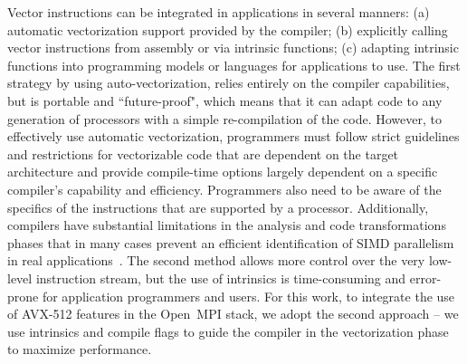 \documentclass[5p,times,twocolumn]{elsarticle}
\newcommand{\ompi}[0]{Open~MPI\xspace}
\begin{document}
Vector instructions can be integrated in applications in several manners:
(a) automatic vectorization support provided by the compiler;
(b) explicitly calling vector instructions from assembly or via intrinsic functions;
(c) adapting intrinsic functions into programming models or languages
for applications to use.
%
The first strategy by using auto-vectorization, relies entirely on the compiler capabilities, but is portable and
``future-proof", which means that it can adapt code to any
generation of processors with a simple
re-compilation of the code. However, to effectively use automatic
vectorization, programmers must follow strict guidelines and restrictions for
vectorizable code that are dependent on the target architecture and provide compile-time options largely dependent
on a specific compiler's capability and efficiency.
%
Programmers also need to be aware of the specifics of the
instructions that are supported by a processor.  Additionally,
compilers have substantial limitations in the analysis and code
transformations phases that in many cases prevent an efficient identification of SIMD
parallelism in real applications~\cite{autoEvaluation}.
%
The second method allows more control over the very low-level
instruction stream, but the use of intrinsics is time-consuming and
error-prone for application programmers and users.
%
For this work, to integrate the use of AVX-512 features in the \ompi
stack, we adopt the second approach -- we use intrinsics and
compile flags to guide the compiler in the vectorization
phase to maximize performance.
\end{document}
